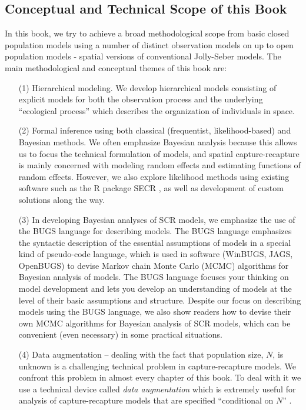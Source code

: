 \subsection{Conceptual and Technical Scope of this Book}

In this book, we try to achieve a broad methodological scope from
basic closed population models using a number of distinct observation
models on up to open population models - spatial versions of
conventional Jolly-Seber models.  The main methodological and
conceptual themes of this book are:

\begin{itemize}
\item[(1)] Hierarchical modeling. We develop hierarchical models
  consisting of explicit models for both the observation process and
  the underlying ``ecological process'' which describes the
  organization of individuals in space.

\item[(2)] Formal inference using both classical (frequentist,
  likelihood-based) and Bayesian methods. We often emphasize
  Bayesian analysis because this allows us to focus the technical
  formulation of models, and spatial capture-recapture is mainly
  concerned with modeling random effects and estimating functions of
  random effects. However, we also explore likelihood methods using existing
  software such as the R package SECR \citep{efford:2011}, as well as
  development of custom solutions along the way.  

\item[(3)] In developing Bayesian analyses of SCR models, we emphasize
  the use of the BUGS language for describing models. The BUGS
  language emphasizes the syntactic description of the essential
  assumptions of models in a special kind of pseudo-code language,
  which is used in software (WinBUGS, JAGS, OpenBUGS) to devise Markov
  chain Monte Carlo (MCMC) algorithms for Bayesian analysis of
  models. The BUGS language focuses your thinking on model development
  and lets you develop an understanding of models at the level of
  their basic assumptions and structure.  Despite our focus on
  describing models using the BUGS language, we also show readers how
  to devise their own MCMC algorithms for Bayesian analysis of SCR
  models, which can be convenient (even necessary) in some practical
  situations.

\item[(4)] Data augmentation -- dealing with the fact that population
  size, $N$, is unknown is a challenging technical problem in
  capture-recapture models. We confront this problem in almost every
  chapter of this book. To deal with it we use a technical device
  called {\it data augmentation} which is extremely useful for
  analysis of capture-recapture models that are specified
  ``conditional on $N$'' \citep{royle_etal:2007}.
\end{itemize}

